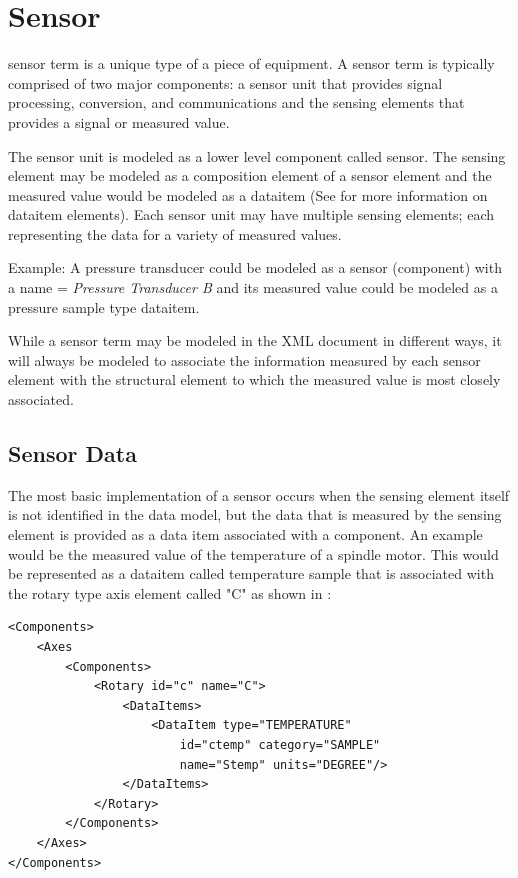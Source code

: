 \documentclass{mtconnect}	%
\begin{document}
\section{Sensor}
\label{sec:Sensors}

\gls{sensor term} is a unique type of a piece of equipment.  A \gls{sensor term} is typically comprised of two major components: a \gls{sensor unit} that provides signal processing, conversion, and communications and the \glspl{sensing element} that provides a signal or measured value.

The \gls{sensor unit} is modeled as a \gls{lower level} \gls{component} called \gls{sensor}.  The \gls{sensing element} may be modeled as a \gls{composition} element of a \gls{sensor} element and the measured value would be modeled as a \gls{dataitem} (See  for more information on \gls{dataitem} elements).  Each \gls{sensor unit} may have multiple \glspl{sensing element}; each representing the data for a variety of measured values.

Example:  A pressure transducer could be modeled as a \gls{sensor} (\gls{component}) with a \gls{name} = \textit{Pressure Transducer B} and its measured value could be modeled as a \gls{pressure sample} type \gls{dataitem}.

While a \gls{sensor term} may be modeled in the XML document in different ways, it will always be modeled to associate the information measured by each \gls{sensor element} with the \gls{structural element} to which the measured value is most closely associated.   

\subsection{Sensor Data}

The most basic implementation of a sensor occurs when the \gls{sensing element} itself is not identified in the data model, but the data that is measured by the \gls{sensing element} is provided as a data item associated with a \gls{component}.  An example would be the measured value of the temperature of a spindle motor.  This would be represented as a \gls{dataitem} called \gls{temperature sample} that is associated with the \gls{rotary} type axis element called "C" as shown in :

\begin{lstlisting}[firstnumber=1,escapechar=|,%
    caption={Example of Sensing Element provided as data item associated with a Component}, label={lst:example-of-sensing-element}]
<Components>
    <Axes
        <Components>
            <Rotary id="c" name="C">
                <DataItems>
                    <DataItem type="TEMPERATURE" 
                        id="ctemp" category="SAMPLE" 
                        name="Stemp" units="DEGREE"/>
                </DataItems>
            </Rotary>
        </Components>
    </Axes>
</Components>
\end{lstlisting}
\end{document}
